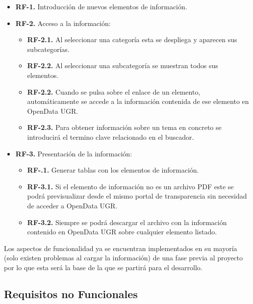 \begin{itemize}
  \item \textbf{RF-1.} Introducción de nuevos elementos de información.
\end{itemize}

\begin{itemize}
  \item \textbf{RF-2.} Acceso a la información:
  \begin{itemize}
    \item \textbf{RF-2.1.} Al seleccionar una categoría esta se despliega y aparecen sus subcategorías.
    \item \textbf{RF-2.2.} Al seleccionar una subcategoría se muestran todos sus elementos.
    \item \textbf{RF-2.2.} Cuando se pulsa sobre el enlace de un elemento, automáticamente se accede a la información contenida 
    de ese elemento en OpenData UGR.
    \item \textbf{RF-2.3.} Para obtener información sobre un tema en concreto se introducirá el termino clave relacionado en 
    el buscador.
    \end{itemize}
\end{itemize}

\begin{itemize}
  \item \textbf{RF-3.} Presentación de la información:
  \begin{itemize}
    \item \textbf{RF-.1.} Generar tablas con los elementos de información.
    \item \textbf{RF-3.1.} Si el elemento de información no es un archivo PDF este se podrá previsualizar desde el mismo portal
    de transparencia sin necesidad de acceder a OpenData UGR.
    \item \textbf{RF-3.2.} Siempre se podrá descargar el archivo con la información contenido en OpenData UGR sobre cualquier 
    elemento listado.
  \end{itemize}
\end{itemize}
	
Los aspectos de funcionalidad ya se encuentran implementados en su mayoría (solo existen problemas al cargar la información) de
una fase previa al proyecto por lo que esta será la base de la que se partirá para el desarrollo.

\subsection{Requisitos no Funcionales}

